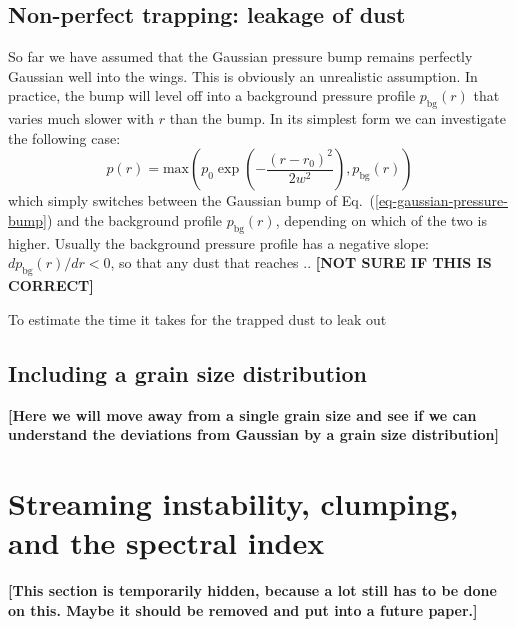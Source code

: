 \documentclass{aa}
\begin{document}
\subsection{Non-perfect trapping: leakage of dust}
\label{sec-leaky-traps}
%
So far we have assumed that the Gaussian pressure bump remains perfectly
Gaussian well into the wings. This is obviously an unrealistic assumption. In
practice, the bump will level off into a background pressure profile
$p_{\mathrm{bg}}(r)$ that varies much slower with $r$ than the bump. In its
simplest form we can investigate the following case:
\begin{equation}
  p(r) = \mathrm{max}\left(
  p_0 \exp\left(-\frac{(r-r_0)^2}{2w^2}\right),
  p_{\mathrm{bg}}(r)\right)
\end{equation}
which simply switches between the Gaussian bump of
Eq.~(\ref{eq-gaussian-pressure-bump}) and the background profile
$p_{\mathrm{bg}}(r)$, depending on which of the two is higher. Usually the
background pressure profile has a negative slope: $dp_{\mathrm{bg}}(r)/dr<0$, so
that any dust that reaches .. {\bf [NOT SURE IF THIS IS CORRECT]}







To estimate
the time it takes for the trapped dust to leak out 



\subsection{Including a grain size distribution}
%
\label{sec-model-with-grain-size-distribution}

{\bf [Here we will move away from a single grain size and see if we can understand
the deviations from Gaussian by a grain size distribution]}



\section{Streaming instability, clumping, and the spectral index}
\label{sec-si-clump}
%

{\bf [This section is temporarily hidden, because a lot still has to be
done on this. Maybe it should be removed and put into a future paper.]}
\end{document}
